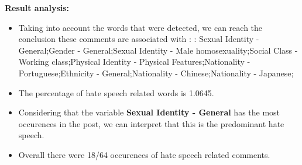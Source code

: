 \documentclass[11pt]{article}
\begin{document}
\textbf{\Large Result analysis:}

\begin{itemize}\item Taking into account the words that were detected, we can reach the conclusion these comments are associated with : : Sexual Identity - General;Gender - General;Sexual Identity - Male homosexuality;Social Class - Working class;Physical Identity - Physical Features;Nationality - Portuguese;Ethnicity - General;Nationality - Chinese;Nationality - Japanese;%

\item The percentage of hate speech related words is 1.0645.

\item Considering that the variable \textbf{Sexual Identity - General} has the most occurences in the post, we can interpret that this is the predominant hate speech.

\item Overall there were 18/64 occurences of hate speech related comments.\end{itemize}
\end{document}
